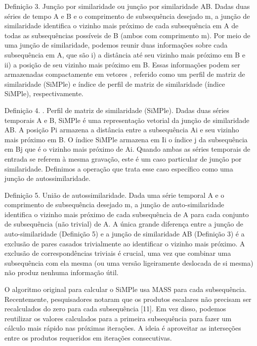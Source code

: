 \documentclass{article}
\begin{document}
Definição 3. Junção por similaridade ou junção por similaridade AB. Dadas duas séries de tempo A e B e o comprimento de subsequência desejado m, a junção de similaridade identifica o vizinho mais próximo de cada subsequência em A de todas as subsequências possíveis de B (ambos com comprimento m). Por meio de uma junção de similaridade, podemos reunir duas informações sobre cada subsequência em A, que são i) a distância até seu vizinho mais próximo em B e ii) a posição de seu vizinho mais próximo em B. Essas informações podem ser armazenadas compactamente em vetores , referido como um perfil de matriz de similaridade (SiMPle) e índice de perfil de matriz de similaridade (índice SiMPle), respectivamente.

Definição 4. . Perfil de matriz de similaridade (SiMPle). Dadas duas séries temporais A e B, SiMPle é uma representação vetorial da junção de similaridade AB. A posição Pi armazena a distância entre a subsequência Ai e seu vizinho mais próximo em B. O índice SiMPle armazena em Ii o índice j da subsequência em Bj que é o vizinho mais próximo de Ai. Quando ambas as séries temporais de entrada se referem à mesma gravação, este é um caso particular de junção por similaridade. Definimos a operação que trata esse caso específico como uma junção de autossimilaridade. 

Definição 5. União de autossimilaridade. Dada uma série temporal A e o comprimento de subsequência desejado m, a junção de auto-similaridade identifica o vizinho mais próximo de cada subsequência de A para cada conjunto de subsequência (não trivial) de A. A única grande diferença entre a junção de auto-similaridade (Definição 5) e a junção de similaridade AB (Definição 3) é a exclusão de pares casados trivialmente ao identificar o vizinho mais próximo. A exclusão de correspondências triviais é crucial, uma vez que combinar uma subsequência com ela mesma (ou uma versão ligeiramente deslocada de si mesma) não produz nenhuma informação útil.

O algoritmo original para calcular o SiMPle usa MASS para cada subsequência. Recentemente, pesquisadores notaram que os produtos escalares não precisam ser recalculados do zero para cada subsequência [11]. Em vez disso, podemos reutilizar os valores calculados para a primeira subsequência para fazer um cálculo mais rápido nas próximas iterações. A ideia é aproveitar as interseções entre os produtos requeridos em iterações consecutivas.
\end{document}
